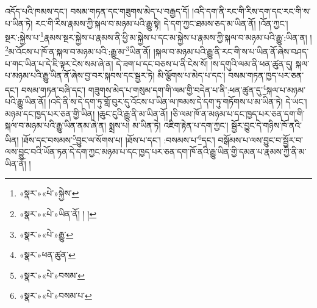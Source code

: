 འདོད་པའི་ཁམས་དང་། བསམ་གཏན་དང་གཟུགས་མེད་པ་བརྒྱད་དོ། །འདི་དག་ནི་རང་གི་རིས་དག་དང་རང་གི་ས་པ་ཡིན་ཏེ། རང་གི་རིས་རྣམས་ཀྱི་སྐལ་བ་མཉམ་པའི་རྒྱུ་སྟེ། དེ་དག་ཀྱང་ཐམས་ཅད་མ་ཡིན་ནོ། །འོན་ཀྱང་། སྔར་:སྐྱེས་པ་\footnote{«སྣར་»«པེ་»སྐྱེས་}རྣམས་སྔར་སྐྱེས་པ་རྣམས་ནི་ཕྱི་མ་སྐྱེས་པ་དང་མ་སྐྱེས་པ་རྣམས་ཀྱི་སྐལ་བ་མཉམ་པའི་རྒྱུ་:ཡིན་ན། །\footnote{«སྣར་»«པེ་»ཡིན་ནོ། ། །}མ་འོངས་པ་ཁོ་ན་སྐལ་བ་མཉམ་པའི་:རྒྱུ་མ་\footnote{«སྣར་»«པེ་»རྒྱུ་}ཡིན་ནོ། །སྐལ་བ་མཉམ་པའི་རྒྱུ་ནི་རང་གི་ས་པ་ཡིན་ནོ་ཞེས་བཤད་པ་གང་ཡིན་པ་དེ་ཇི་ལྟར་ངེས་སམ་ཞེ་ན། དེ་ཟག་པ་དང་བཅས་པ་ནི་ངེས་སོ། །ས་དགུའི་ལམ་ནི་ཕན་ཚུན་དུ། སྐལ་པ་མཉམ་པའི་རྒྱུ་ཡིན་ནོ་ཞེས་བྱ་བར་སྐབས་དང་སྦྱར་ཏེ། མི་ལྕོགས་པ་མེད་པ་དང་། བསམ་གཏན་ཁྱད་པར་ཅན་དང་། བསམ་གཏན་བཞི་དང་། གཟུགས་མེད་པ་གསུམ་དག་གི་ལམ་གྱི་བདེན་པ་ནི་:ཕན་ཚུན་དུ་\footnote{«སྣར་»ཕན་ཚུན་}སྐལ་པ་མཉམ་པའི་རྒྱུ་ཡིན་ནོ། །འདི་ནི་ས་དེ་དག་ཏུ་གློ་བུར་དུ་འོངས་པ་ཡིན་ལ་ཁམས་དེ་དག་ཏུ་གཏོགས་པ་མ་ཡིན་ཏེ། དེ་ཡང་། མཉམ་དང་ཁྱད་པར་ཅན་གྱི་ཡིན། །ཆུང་ངུའི་རྒྱུ་ནི་མ་ཡིན་ནོ། །ཅི་ལམ་ཁོ་ན་མཉམ་པ་དང་ཁྱད་པར་ཅན་དག་གི་སྐལ་བ་མཉམ་པའི་རྒྱུ་ཡིན་ནམ་ཞེ་ན། སྨྲས་པ། མ་ཡིན་ཏེ། འཇིག་རྟེན་པ་དག་ཀྱང་། སྦྱོར་བྱུང་དེ་གཉིས་ཁོ་ནའི་ཡིན། །ཐོས་དང་བསམས་\footnote{«སྣར་»«པེ་»བསམ་}བྱུང་ལ་སོགས་པ། །ཐོས་པ་དང་། :བསམས་པ་\footnote{«སྣར་»«པེ་»བསམ་པ་}དང་། བསྒོམས་པ་ལས་བྱུང་བ་སྦྱོར་བ་ལས་བྱུང་བའི་ཡོན་ཏན་དེ་དག་ཀྱང་མཉམ་པ་དང་ཁྱད་པར་ཅན་དག་ཁོ་ནའི་རྒྱུ་ཡིན་གྱི་དམན་པ་རྣམས་ཀྱི་ནི་མ་ཡིན་ནོ། །
